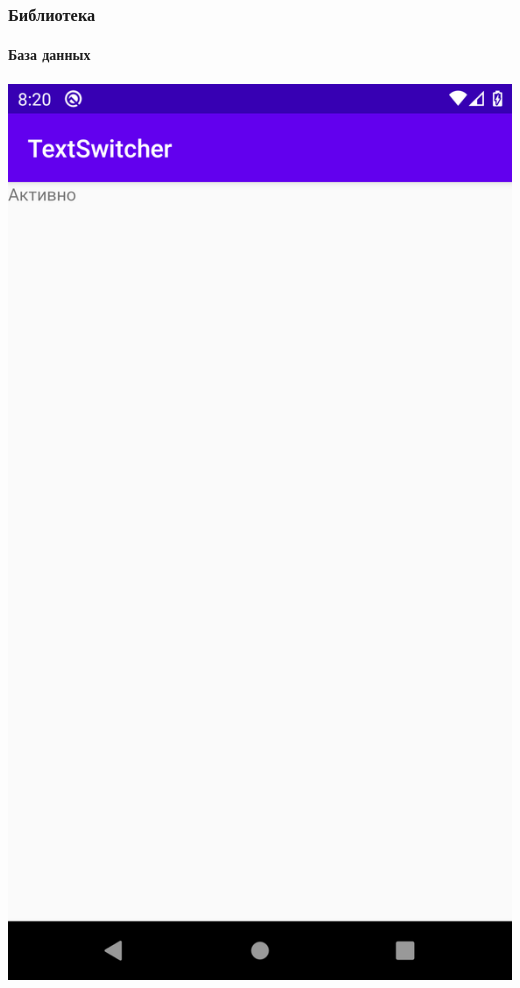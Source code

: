 \documentclass{beamer}
\begin{document}
    \begin{frame}
        \frametitle{Библиотека}
        \framesubtitle{База данных}
        \begin{multicols}{2}
            \centering
            \includegraphics[width=0.75\linewidth]{switcher}


\end{multicols}
\end{frame}
\end{document}
